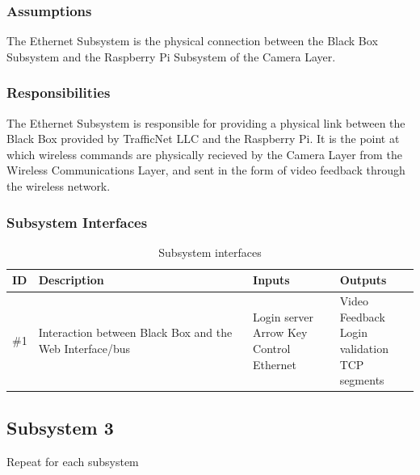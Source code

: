 \subsubsection{Assumptions}
The Ethernet Subsystem is the physical connection between the Black Box Subsystem and the Raspberry Pi Subsystem of the Camera Layer.

\subsubsection{Responsibilities}
The Ethernet Subsystem is responsible for providing a physical link between the Black Box provided by TrafficNet LLC and the Raspberry Pi. It is the point at which wireless commands are physically recieved by the Camera Layer from the Wireless Communications Layer, and sent in the form of video feedback through the wireless network.

\subsubsection{Subsystem Interfaces}

\begin {table}[H]
\caption {Subsystem interfaces} 
\begin{center}
    \begin{tabular}{ | p{1cm} | p{6cm} | p{3cm} | p{3cm} |}
    \hline
    ID & Description & Inputs & Outputs \\ \hline
    \#1 & Interaction between Black Box and the Web Interface/bus & \pbox{3cm}{Login server \\ Arrow Key Control \\ Ethernet} & \pbox{3cm}{Video Feedback \\ Login validation \\ TCP segments}  \\ \hline
    \end{tabular}
\end{center}
\end{table}

\subsection{Subsystem 3}
Repeat for each subsystem

